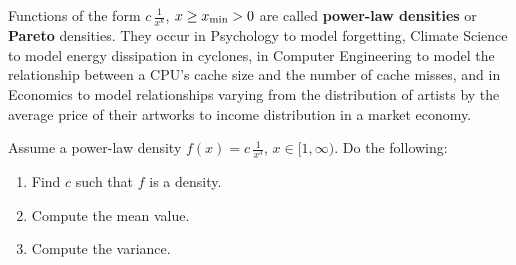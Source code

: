 \bigskip

Functions of the form $c \, \frac{1}{x^k}$, $x \ge x_{\rm min}>0$ are called \textbf{power-law densities} or \textbf{Pareto} densities. They occur in Psychology to model forgetting, Climate Science to model energy dissipation in cyclones, in Computer Engineering to model the relationship between a CPU's cache size and the number of cache misses, and in Economics to model relationships varying from the distribution of artists by the average price of their artworks to income distribution in a market economy.

\bigskip

\begin{example} Assume a power-law density $f(x) = c \, \frac{1}{x^3}$, $x \in [1, \infty)$. Do the following:
\begin{enumerate}
\renewcommand{\labelenumi}{(\alph{enumi})}
\setlength{\itemsep}{.2cm}
    \item Find $c$ such that $f$ is a density.
    \item Compute the mean value.
    \item Compute the variance.
\end{enumerate}
\end{example}

